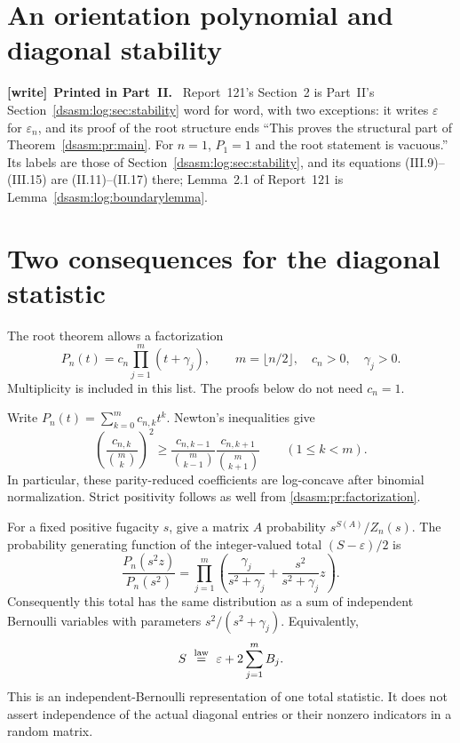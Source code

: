 \documentclass[11pt,letterpaper]{article}
\theoremstyle{remark}\newtheorem{remark}[theorem]{Remark}
\newcommand{\eps}{\varepsilon}\newcommand{\HH}{\mathcal H}\newcommand{\one}{\mathbf1}
\newenvironment{writenote}[1][]{\par\smallskip\begingroup\small
 \noindent\textbf{[write]}\if\relax\detokenize{#1}\relax\else~\textbf{#1.}\fi\ }%
 {\par\endgroup\smallskip}
\begin{document}
\section{An orientation polynomial and diagonal stability}
\label{dsasm:pr:sec:stability}
\begin{writenote}[Printed in Part~II]
Report~121's Section~2 is Part~II's Section~\ref{dsasm:log:sec:stability} word for word, with two exceptions: it writes $\eps$ for $\eps_n$, and its proof of the root structure ends ``This proves the structural part of Theorem~\ref{dsasm:pr:main}. For $n=1$, $P_1=1$ and the root statement is vacuous.'' Its labels are those of Section~\ref{dsasm:log:sec:stability}, and its equations (III.9)--(III.15) are (II.11)--(II.17) there; Lemma~2.1 of Report~121 is Lemma~\ref{dsasm:log:boundarylemma}.
\end{writenote}
\setcounter{equation}{15}
\section{Two consequences for the diagonal statistic}\label{dsasm:pr:sec:consequences}

The root theorem allows a factorization
\begin{equation}\label{dsasm:pr:factorization}
 P_n(t)=c_n\prod_{j=1}^m(t+\gamma_j),\qquad
 m=\lfloor n/2\rfloor,\quad c_n>0,\quad\gamma_j>0.
\end{equation}
Multiplicity is included in this list. The proofs below do not need
$c_n=1$.

Write $P_n(t)=\sum_{k=0}^m c_{n,k}t^k$. Newton's inequalities give
\begin{equation}\label{dsasm:pr:newton}
 \left(\frac{c_{n,k}}{\binom mk}\right)^2
 \ge \frac{c_{n,k-1}}{\binom m{k-1}}
      \frac{c_{n,k+1}}{\binom m{k+1}}
 \qquad(1\le k<m).
\end{equation}
In particular, these parity-reduced coefficients are log-concave after
binomial normalization. Strict positivity follows as well from
\eqref{dsasm:pr:factorization}.

For a fixed positive fugacity $s$, give a matrix $A$ probability
$s^{S(A)}/Z_n(s)$. The probability generating function of the
integer-valued total $(S-\eps)/2$ is
\[
 \frac{P_n(s^2z)}{P_n(s^2)}
 =\prod_{j=1}^m
   \left(\frac{\gamma_j}{s^2+\gamma_j}
              +\frac{s^2}{s^2+\gamma_j}z\right).
\]
Consequently this total has the same distribution as a sum of
independent Bernoulli variables with parameters
$s^2/(s^2+\gamma_j)$. Equivalently,
\[
 S\ \overset{\rm law}=\ \eps+2\sum_{j=1}^m B_j.
\]
This is an independent-Bernoulli representation of one total
statistic. It does not assert independence of the actual diagonal
entries or their nonzero indicators in a random matrix.
\end{document}
